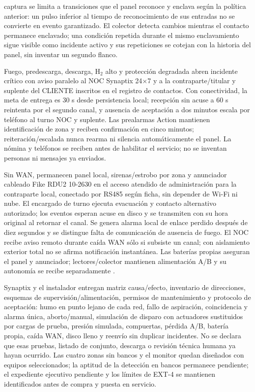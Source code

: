 captura se limita a transiciones que el panel reconoce y enclava según la política anterior: un pulso inferior al tiempo de reconocimiento de sus entradas no se convierte en evento garantizado. El colector detecta cambios mientras el contacto permanece enclavado; una condición repetida durante el mismo enclavamiento sigue visible como incidente activo y sus repeticiones se cotejan con la historia del panel, sin inventar un segundo flanco.

Fuego, predescarga, descarga, H$_2$ alto y protección degradada abren incidente crítico con aviso paralelo al NOC Synaptix 24$\times$7 y a la contraparte/titular y suplente del CLIENTE inscritos en el registro de contactos. Con conectividad, la meta de entrega es 30 s desde persistencia local; recepción sin acuse a 60 s reintenta por el segundo canal, y ausencia de aceptación a dos minutos escala por teléfono al turno NOC y suplente. Las prealarmas Action mantienen identificación de zona y reciben confirmación en cinco minutos; reiteración/escalada nunca rearma ni silencia automáticamente el panel. La nómina y teléfonos se reciben antes de habilitar el servicio; no se inventan personas ni mensajes ya enviados.

Sin WAN, permanecen panel local, sirenas/estrobo por zona y anunciador cableado Fike RDU2 10-2630 en el acceso atendido de administración para la contraparte local, conectado por RS485 según ficha, sin depender de Wi-Fi ni nube. El encargado de turno ejecuta evacuación y contacto alternativo autorizado; los eventos esperan acuse en disco y se transmiten con su hora original al retornar el canal. Se genera alarma local de enlace perdido después de diez segundos y se distingue falta de comunicación de ausencia de fuego. El NOC recibe aviso remoto durante caída WAN sólo si subsiste un canal; con aislamiento exterior total no se afirma notificación instantánea. Las baterías propias aseguran el panel y anunciador; lectores/colector mantienen alimentación A/B y su autonomía se recibe separadamente \parencite[pp.~3--6]{l18-cheetah}.

Synaptix y el instalador entregan matriz causa/efecto, inventario de direcciones, esquemas de supervisión/alimentación, permisos de mantenimiento y protocolo de aceptación: humo en punto lejano de cada red, fallo de aspiración, coincidencia y alarma única, aborto/manual, simulación de disparo con actuadores sustituidos por cargas de prueba, presión simulada, compuertas, pérdida A/B, batería propia, caída WAN, disco lleno y reenvío sin duplicar incidentes. No se declara que esas pruebas, listado de conjunto, descarga o revisión técnica humana ya hayan ocurrido. Las cuatro zonas sin bancos y el monitor quedan diseñados con equipos seleccionados; la aptitud de la detección en bancos permanece pendiente; el expediente ejecutivo pendiente y los límites de EXT-4 se mantienen identificados antes de compra y puesta en servicio.
